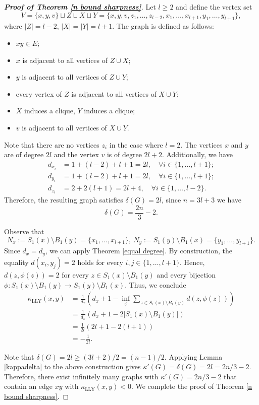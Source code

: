 \documentclass[11pt,bezier]{article}
\theoremstyle{definition}
\theoremstyle{definition}
\theoremstyle{nonumber}
\begin{document}
\begin{proof}[\bf{Proof of Theorem \ref{n bound sharpness}}]
Let $l\geq2$ and define the vertex set
$$
V =\{x,y,v\}\sqcup Z \sqcup X \sqcup Y = \{x, y, v, z_1, \dots, z_{l-2}, x_1, \dots, x_{l+1}, y_1, \dots, y_{l+1}\},
$$
where $|Z|=l-2$, $|X|=|Y|=l+1$.
The graph is defined as follows:
\begin{itemize}
\item $xy\in E$;
\item $x$ is adjacent to all vertices of $Z\cup X$;
\item $y$ is adjacent to all vertices of $Z\cup Y$;
\item every vertex of $Z$ is adjacent to all vertices of $X\cup Y$;
\item $X$ induces a clique, $Y$ induces a clique;
\item $v$ is adjacent to all vertices of $X\cup Y$.
\end{itemize}
Note that there are no vertices $z_i$ in the case where $l = 2$. The vertices $x$ and $y$ are of degree $2l$ and the vertex $v$ is of degree $2l+2$.
Additionally, we have
\begin{align*}
d_{x_i} &= 1 + (l - 2) + l  + 1 = 2l,\quad \forall i \in \{1, \dots, l+1\};\\
d_{y_i} &= 1 + (l - 2) + l  + 1 = 2l,\quad \forall i \in \{1, \dots, l+1\};\\
d_{z_i} &= 2 + 2(l+1) = 2l + 4,\quad \forall i \in \{1, \dots, l-2\}.
\end{align*}
Therefore, the resulting graph satisfies $\delta(G) = 2l$, since $n = 3l + 3$ we have
$$
\delta(G) = \frac{2n}{3} - 2.
$$

Observe that
$$N_x:=S_1(x) \setminus B_1(y) = \{x_1, \dots, x_{l+1}\},\
N_y:=S_1(y) \setminus B_1(x) = \{y_1, \dots, y_{l+1}\}.$$
Since $d_x = d_y$, we can apply Theorem \ref{equal degree}. By construction, the equality $d(x_i, y_j) = 2$ holds for every $i, j \in \{1, \dots, l+1\}$. Hence, $d(z, \phi(z)) = 2$ for every $z \in S_1(x) \setminus B_1(y)$ and every bijection $\phi : S_1(x) \setminus B_1(y) \to S_1(y) \setminus B_1(x)$. Thus, we conclude
\begin{align*}
\kappa_{\mathrm{LLY}}(x, y) &= \frac{1}{d_x} \left( d_x + 1 - \inf_{\phi} \sum_{z \in S_1(x) \setminus B_1(y)} d(z, \phi(z)) \right)\\
&= \frac{1}{d_x} \left( d_x + 1 - 2|S_1(x) \setminus B_1(y)| \right)\\
&= \frac{1}{2l} \left( 2l + 1 - 2 \left( l + 1 \right) \right)\\
&=  -\frac{1}{2l}.
\end{align*}

Note that $\delta(G)=2l\geq(3l+2)/2=(n-1)/2.$
Applying Lemma \ref{kappadelta} to the above construction gives
$\kappa'(G)=\delta(G)=2l=2n/3-2.$
Therefore, there exist infinitely many graphs with $\kappa'(G)=2n/3-2$ that contain an edge $xy$ with $\kappa_{\mathrm{LLY}}(x, y) < 0$.
We complete the proof of Theorem \ref{n bound sharpness}.
\end{proof}
\end{document}
